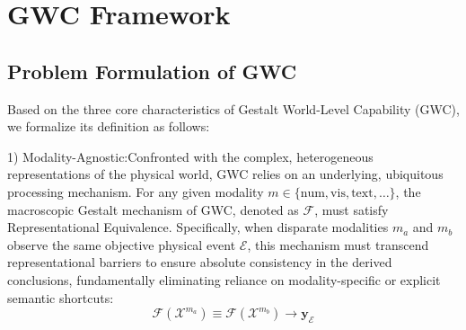


\section{GWC Framework} 

\label{sec:mhlc-benchmark}
\subsection{Problem Formulation of GWC}
Based on the three core characteristics of Gestalt World-Level Capability (GWC), we formalize its definition as follows:

1) Modality-Agnostic:Confronted with the complex, heterogeneous representations of the physical world, GWC relies on an underlying, ubiquitous processing mechanism. For any given modality $m \in \{\text{num}, \text{vis}, \text{text}, \dots\}$, the macroscopic Gestalt mechanism of GWC, denoted as $\mathcal{F}$, must satisfy Representational Equivalence. Specifically, when disparate modalities $m_a$ and $m_b$ observe the same objective physical event $\mathcal{E}$, this mechanism must transcend representational barriers to ensure absolute consistency in the derived conclusions, fundamentally eliminating reliance on modality-specific or explicit semantic shortcuts:$$\mathcal{F}(\mathcal{X}^{m_a}) \equiv \mathcal{F}(\mathcal{X}^{m_b}) \rightarrow \mathbf{y}_{\mathcal{E}}$$

